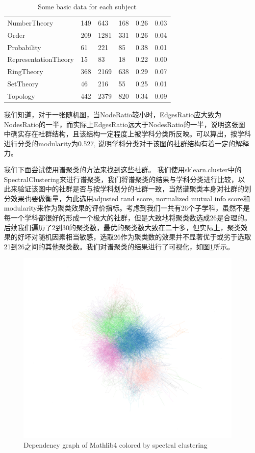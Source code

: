 \begin{table}[H]
\begin{tabular}{llllll}
    NumberTheory & 149 & 643 & 168 & 0.26 & 0.03\\
    Order & 209 & 1281 & 331 & 0.26 & 0.04\\
    Probability & 61 & 221 & 85 & 0.38 & 0.01\\
    RepresentationTheory & 15 & 83 & 18 & 0.22 & 0.00\\
    RingTheory & 368 & 2169 & 638 & 0.29 & 0.07\\
    SetTheory & 46 & 216 & 55 & 0.25 & 0.01\\
    Topology& 442 & 2379 & 820 & 0.34 & 0.09\\
    \bottomrule
\end{tabular}
\caption{Some basic data for each subject}
\label{tab:Ratio}
\end{table}

我们知道，对于一张随机图，当NodeRatio较小时，EdgesRatio应大致为NodesRatio的一半，而实际上EdgesRatio远大于NodesRatio的一半，说明这张图中确实存在社群结构，且该结构一定程度上被学科分类所反映。可以算出，按学科进行分类的modularity为0.527, 说明学科分类对于该图的社群结构有着一定的解释力。

我们下面尝试使用谱聚类的方法来找到这些社群。
我们使用sklearn.cluster中的SpectralClustering来进行谱聚类，我们将谱聚类的结果与学科分类进行比较，以此来验证该图中的社群是否与按学科划分的社群一致，当然谱聚类本身对社群的划分效果也要做衡量，为此选用adjusted rand score, normalized mutual info score和modularity来作为聚类效果的评价指标。考虑到我们一共有26个子学科，虽然不是每一个学科都很好的形成一个极大的社群，但是大致地将聚类数选成26是合理的。后续我们遍历了2到30的聚类数，最优的聚类数大致在二十多，但实际上，聚类效果的好坏对随机因素相当敏感，选取26作为聚类数的效果并不显著优于或劣于选取21到26之间的其他聚类数。我们对谱聚类的结果进行了可视化，如图\ref{fig:clustering}所示。

\begin{figure}[H]
    \centering
    \includegraphics[width=1.0\textwidth]{../img/graph_spectral_cluster.pdf}
    \caption{Dependency graph of Mathlib4 colored by spectral clustering}
    \label{fig:clustering}
\end{figure}

